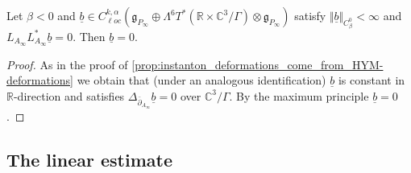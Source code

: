 \documentclass[11pt,a4paper]{scrartcl}
\newcommand{\VertWC}[3]{\Vert_{C^{{#1}}_{{#2}}{#3}}}
\numberwithin{equation}{section}
\theoremstyle{plain}
\theoremstyle{definition}
\theoremstyle{remark}
\begin{document}
\begin{proposition}\label{prop:instanton_deformations_vanish_over_euklidean_space}
Let $\beta < 0$ and $\underline{b} \in C^{k,\alpha}_{\ell oc} (\mathfrak{g}_{P_\infty}\oplus\Lambda^6T^*(\mathbb{R}\times \mathbb{C}^3/\Gamma)\otimes \mathfrak{g}_{P_\infty})$ satisfy $\Vert \underline{b} \VertWC{0}{\beta}{} < \infty$ and $L_{A_\infty}L_{A_\infty}^* \underline{b}=0$. Then $\underline{b} = 0.$
\end{proposition}

\begin{proof}
As in the proof of \autoref{prop:instanton_deformations_come_from_HYM-deformations} we obtain that (under an analogous identification) $\underline{b}$ is constant in $\mathbb{R}$-direction and satisfies $\Delta_{\bar{\partial}_{A_\infty}} \underline{b}=0$ over $\mathbb{C}^3/\Gamma$. By the maximum principle $\underline{b}=0$.
\end{proof}

\subsection{The linear estimate}
\end{document}
